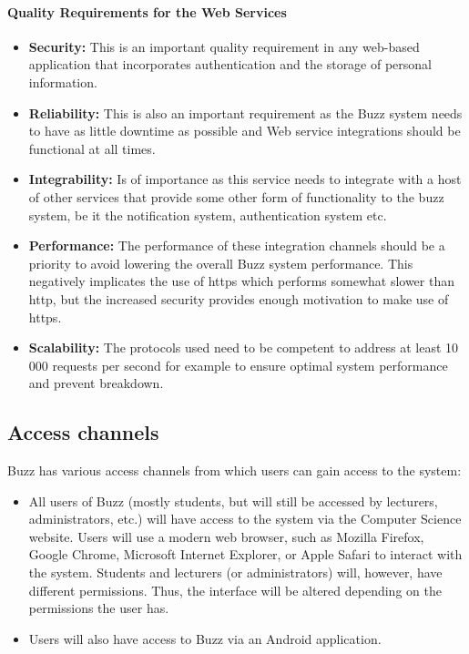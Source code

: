 \documentclass[a4paper,12pt]{report}
\begin{document}
	\paragraph{Quality Requirements for the Web Services}
	\begin{itemize}
	\item{\textbf{Security:} This is an important quality requirement in any web-based application that incorporates authentication and the storage of personal information.}
	\item{\textbf{Reliability:} This is also an important requirement as the Buzz system needs to have as little downtime as possible and Web service integrations should be functional at all times. }
	\item{\textbf{Integrability:} Is of importance as this service needs to integrate with a host of other services that provide some other form of functionality to the buzz system, be it the notification system, authentication system etc.}
	\item{\textbf{Performance:} The performance of these integration channels should be a priority to avoid lowering the overall Buzz system performance. This negatively implicates the use of https which performs somewhat slower than http, but the increased security provides enough motivation to make use of https.}
	\item{\textbf{Scalability:} The protocols used need to be competent to address at least 10 000 requests per second for example to ensure optimal system performance and prevent breakdown.}
	\end{itemize}
\subsection{Access channels}
	Buzz has various access channels from which users can gain access to the system:
	\begin{itemize}
		\item All users of Buzz (mostly students, but will still be accessed by lecturers, administrators, etc.) will have access to the system via the Computer Science website. Users will use a modern web browser, such as Mozilla Firefox, Google Chrome, Microsoft Internet Explorer, or Apple Safari to interact with the system. Students and lecturers (or administrators) will, however, have different permissions. Thus, the interface will be altered depending on the permissions the user has.
		\item Users will also have access to Buzz via an Android application.
	\end{itemize} 	
\end{document}
